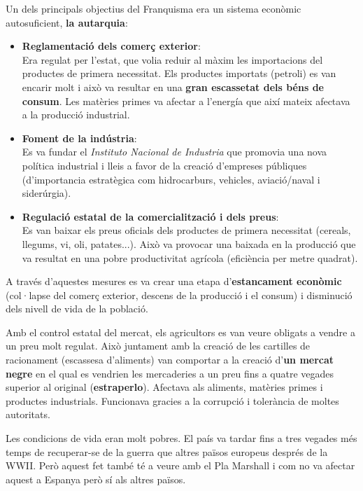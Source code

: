 \documentclass[arial,a4paper,print]{article}
\begin{document}
Un dels principals objectius del Franquisma era un sistema econòmic autosuficient, \textbf{la autarquia}:
\begin{itemize}
\item \textbf{Reglamentació dels comerç exterior}:\\
Era regulat per l'estat, que volia reduir al màxim les importacions del productes de primera necessitat. Els productes importats (petroli) es van encarir molt i això va resultar en una \textbf{gran escassetat dels béns de consum}. Les matèries primes va afectar a l'energía que així mateix afectava a la producció industrial. 

\item \textbf{Foment de la indústria}:\\
Es va fundar el \textit{Instituto Nacional de Industria} que promovia una nova política industrial i lleis a favor de la creació d'empreses públiques (d'importancia estratègica com hidrocarburs, vehicles, aviació/naval i siderúrgia). 

\item \textbf{Regulació estatal de la comercialització i dels preus}:\\
Es van baixar els preus oficials dels productes de primera necessitat (cereals, llegums, vi, oli, patates...). Això va provocar una baixada en la producció que va resultat en una pobre productivitat agrícola (eficiència per metre quadrat). 
\end{itemize}

A través d'aquestes mesures es va crear una etapa d'\textbf{estancament econòmic} (col·lapse del comerç exterior, descens de la producció i el consum) i disminució dels nivell de vida de la població. 

Amb el control estatal del mercat, els agricultors es van veure obligats a vendre a un preu molt regulat. Això juntament amb la creació de les cartilles de racionament (escassesa d'aliments) van comportar a la creació d'\textbf{un mercat negre} en el qual es vendrien les mercaderies a un preu fins a quatre vegades superior al original (\textbf{estraperlo}). Afectava als aliments, matèries primes i productes industrials. Funcionava gracies a la corrupció i tolerància de moltes autoritats. 

Les condicions de vida eran molt pobres. El país va tardar fins a tres vegades més temps de recuperar-se de la guerra que altres països europeus després de la WWII. Però aquest fet també té a veure amb el Pla Marshall i com no va afectar aquest a Espanya però sí als altres països. 
\end{document}
